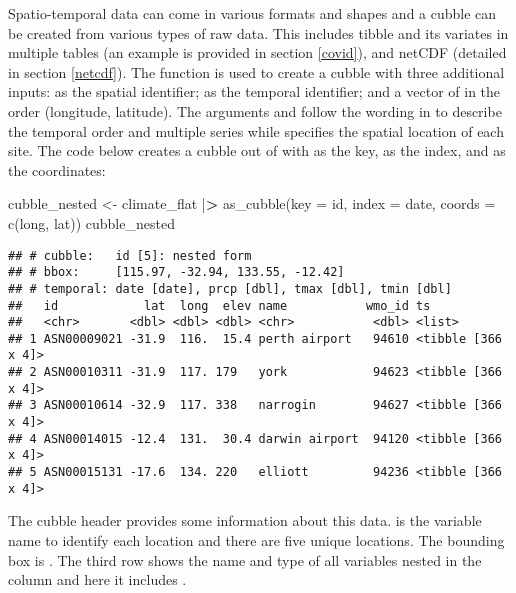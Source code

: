 \documentclass{article}
\newenvironment{Shaded}{\begin{snugshade}}{\end{snugshade}}
\newcommand{\AttributeTok}[1]{\textcolor[rgb]{0.77,0.63,0.00}{#1}}
\newcommand{\ErrorTok}[1]{\textcolor[rgb]{0.64,0.00,0.00}{\textbf{#1}}}
\newcommand{\FunctionTok}[1]{\textcolor[rgb]{0.00,0.00,0.00}{#1}}
\newcommand{\NormalTok}[1]{#1}
\newcommand{\OtherTok}[1]{\textcolor[rgb]{0.56,0.35,0.01}{#1}}
\newcommand{\SpecialCharTok}[1]{\textcolor[rgb]{0.00,0.00,0.00}{#1}}
\begin{document}
Spatio-temporal data can come in various formats and shapes and a cubble can be created from various types of raw data. This includes tibble and its variates in multiple tables (an example is provided in section \ref{covid}), and netCDF (detailed in section \ref{netcdf}). The function  is used to create a cubble with three additional inputs:  as the spatial identifier;  as the temporal identifier; and a vector of  in the order (longitude, latitude). The arguments  and  follow the wording in  to describe the temporal order and multiple series while  specifies the spatial location of each site. The code below creates a cubble out of  with  as the key,  as the index, and  as the coordinates:

\begin{Shaded}
\begin{Highlighting}[]
\NormalTok{cubble\_nested }\OtherTok{\textless{}{-}}\NormalTok{ climate\_flat }\SpecialCharTok{|}\ErrorTok{\textgreater{}}
  \FunctionTok{as\_cubble}\NormalTok{(}\AttributeTok{key =}\NormalTok{ id, }\AttributeTok{index =}\NormalTok{ date, }\AttributeTok{coords =} \FunctionTok{c}\NormalTok{(long, lat))}
\NormalTok{cubble\_nested}
\end{Highlighting}
\end{Shaded}

\begin{verbatim}
## # cubble:   id [5]: nested form
## # bbox:     [115.97, -32.94, 133.55, -12.42]
## # temporal: date [date], prcp [dbl], tmax [dbl], tmin [dbl]
##   id            lat  long  elev name           wmo_id ts                
##   <chr>       <dbl> <dbl> <dbl> <chr>           <dbl> <list>            
## 1 ASN00009021 -31.9  116.  15.4 perth airport   94610 <tibble [366 x 4]>
## 2 ASN00010311 -31.9  117. 179   york            94623 <tibble [366 x 4]>
## 3 ASN00010614 -32.9  117. 338   narrogin        94627 <tibble [366 x 4]>
## 4 ASN00014015 -12.4  131.  30.4 darwin airport  94120 <tibble [366 x 4]>
## 5 ASN00015131 -17.6  134. 220   elliott         94236 <tibble [366 x 4]>
\end{verbatim}

The cubble header provides some information about this data.  is the variable name to identify each location and there are five unique locations. The bounding box is \code{[115.97, -32.94, 133.55, -12.42]}. The third row shows the name and type of all variables nested in the  column and here it includes .
\end{document}
